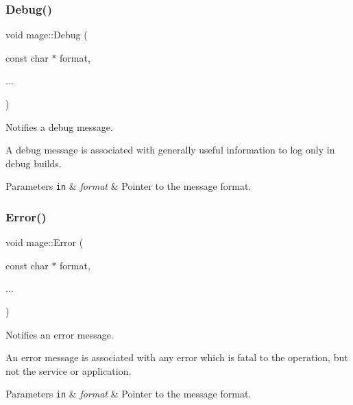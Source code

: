 \hypertarget{namespacemage_a1bcf1f0301e170105908eee5b5c46830}{}\label{namespacemage_a1bcf1f0301e170105908eee5b5c46830} 
\subsubsection{\texorpdfstring{Debug()}{Debug()}}
{\footnotesize\ttfamily void mage\+::\+Debug (\begin{DoxyParamCaption}\item[{const char $\ast$}]{format,  }\item[{}]{... }\end{DoxyParamCaption})}

Notifies a debug message.

A debug message is associated with generally useful information to log only in debug builds.


\begin{DoxyParams}[1]{Parameters}
\mbox{\tt in}  & {\em format} & Pointer to the message format. \\
\hline
\end{DoxyParams}
\hypertarget{namespacemage_a52a7fe8c9ce39afd9e0b0299373db0fa}{}\label{namespacemage_a52a7fe8c9ce39afd9e0b0299373db0fa} 
\subsubsection{\texorpdfstring{Error()}{Error()}}
{\footnotesize\ttfamily void mage\+::\+Error (\begin{DoxyParamCaption}\item[{const char $\ast$}]{format,  }\item[{}]{... }\end{DoxyParamCaption})}

Notifies an error message.

An error message is associated with any error which is fatal to the operation, but not the service or application.


\begin{DoxyParams}[1]{Parameters}
\mbox{\tt in}  & {\em format} & Pointer to the message format. \\
\hline
\end{DoxyParams}
\hypertarget{namespacemage_a6bbe2c1ce9b49dea0c61ce4eafea6a3d}{}\label{namespacemage_a6bbe2c1ce9b49dea0c61ce4eafea6a3d} 
